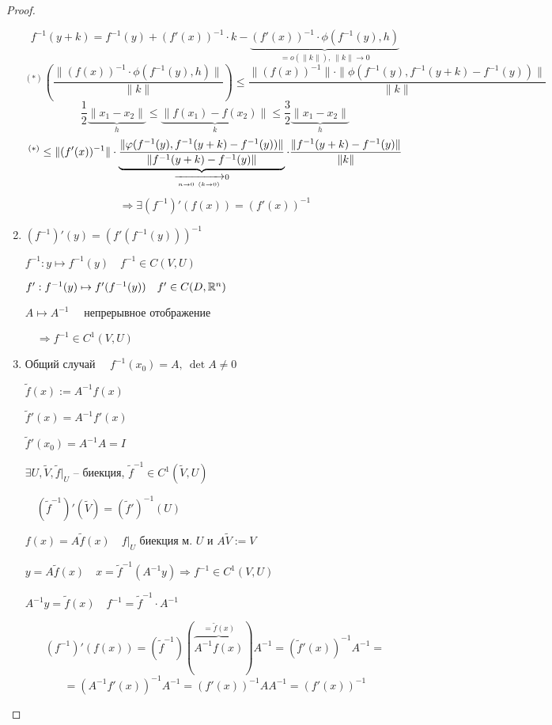\begin{proof}
\begin{enumerate}
\[                \]
                \[
                    f^{-1}(y + k) = f^{-1}(y) + (f'(x))^{-1} \cdot k - \underbrace{(f'(x))^{-1} \cdot \phi(f^{-1}(y), h)} _{= o(\|k\|), \ \|k\| \rightarrow 0}   
                \]
                \[
                    ^{(*)}\left(\frac{\|(f(x))^{-1} \cdot \phi(f^{-1}(y), h)\|}{\|k\|}\right) \le \frac{\|\left(f(x)\right)^{-1}\| \cdot \|\phi(f^{-1}(y), f^{-1}(y + k) - f^{-1}(y))\|}{\|k\|}    
                \]
                \[
                    \frac12\underbrace{\|x_1 - x_2\|}_{h} \le \underbrace{\|f(x_1) - f(x_2)\|}_{k} \le \frac32\underbrace{\|x_1 - x_2\|}_{h}   
                \]
                \[
                    ^{(*)} \le \|(f'(x))^{-1}\| \cdot \underbrace{\frac{\|\phi(f^{-1}(y), f^{-1}(y + k) - f^{-1}(y))\|}{\|f^{-1}(y + k) - f^{-1}(y)\|}}_{\xrightarrow[n \rightarrow 0 \newline (k \rightarrow 0)]{} 0} \cdot \frac{\|f^{-1}(y+k) - f^{-1}(y)\|}{\|k\|}
                \]
                \[
                    \Rightarrow \exists (f^{-1})'(f(x)) = (f'(x))^{-1}    
                \]
            \item $\left(f^{-1}\right)'(y) = \left(f'(f^{-1}(y))\right)^{-1}$
                \par $f^{-1} : y \mapsto f^{-1}(y) \quad f^{-1} \in C(V, U)$
                \par $f' : f^{-1}(y) \mapsto f'(f^{-1}(y)) \quad f' \in C(D, \mathbb{R}^n)$
                \par $A \mapsto A^{-1} \quad$ непрерывное отображение
                \par $\quad \Rightarrow f^{-1} \in C^1(V, U)$
            \item Общий случай $\quad f^{-1}(x_0) = A, \ \det A \not= 0$
                \par $\tilde f(x) := A^{-1}f(x)$
                \par $\tilde f'(x) = A^{-1}f'(x)$
                \par $\tilde f'(x_0) = A^{-1}A = I$
                \par $\exists U, \tilde V, \tilde f\big|_U$ -- биекция, $\tilde f^{-1} \in C^1(\tilde V, U)$
                \par $\quad (\tilde f^{-1})' (\tilde V) = (\tilde f')^{-1}(U)$
                \par $f(x) = A \tilde f(x) \quad f\big|_U$ биекция м. $U$ и $A \tilde V := V$
                \par $y = A \tilde f(x) \quad x = \tilde f^{-1}(A^{-1} y) \Rightarrow f^{-1} \in C^1(V, U)$
                \par $A^{-1}y = \tilde f(x) \quad f^{-1} = \tilde f^{-1} \cdot A^{-1}$
                
                \[
                    (f^{-1})'(f(x)) = (\tilde f^{-1})(\overbrace{A^{-1}f(x)}^{=\tilde f(x)}) A^{-1} = (\tilde f'(x))^{-1} A^{-1} =
                \]
                \[
                    = (A^{-1} f'(x))^{-1}A^{-1} = (f'(x))^{-1} AA^{-1} = (f'(x))^{-1}    
                \]
        \end{enumerate}
    \end{proof}

